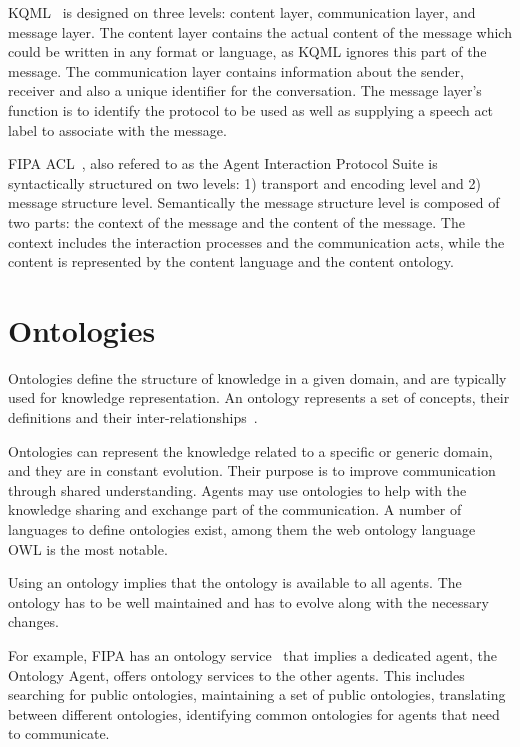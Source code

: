 \documentclass[a4paper,12pt,oneside,fleqn]{book} %
\begin{document}
KQML~\cite{DBLP:conf/cikm/FininFMM94} is designed on three levels: content
layer, communication layer, and message layer. The content layer contains
the actual content of the message which could be written in any format or
language, as KQML ignores this part of the message. The communication layer
contains information about the sender, receiver and also a unique
identifier for the conversation. The message layer's function is to
identify the protocol to be used as well as supplying a speech act label to
associate with the message.

FIPA ACL~\cite{DBLP:journals/taas/Poslad07}, also refered to as the Agent
Interaction Protocol Suite is syntactically structured on two levels: 1)
transport and encoding level and 2) message structure level. Semantically
the message structure level is composed of two parts: the context of the
message and the content of the message. The context includes the
interaction processes and the communication acts, while the content is
represented by the content language and the content ontology.

\section{Ontologies} %

Ontologies define the structure of knowledge in a given domain, and are
typically used for knowledge representation. An ontology represents a set
of concepts, their definitions and their inter-relationships~\cite{DBLP:journals/ker/UscholdG96}. 

Ontologies can represent the knowledge related to a specific or generic
domain, and they are in constant evolution. Their purpose is to improve
communication through shared understanding. Agents may use ontologies to
help with the knowledge sharing and exchange part of the communication. A
number of languages to define ontologies exist, among them the web ontology
language OWL is the most notable.

Using an ontology implies that the ontology is available to all agents. The
ontology has to be well maintained and has to evolve along with the
necessary changes.


For example, FIPA has an ontology service~\cite{web:fipaOntol} that implies
a dedicated agent, the Ontology Agent, offers ontology services to the
other agents.  This includes searching for public ontologies, maintaining a
set of public ontologies, translating between different ontologies,
identifying common ontologies for agents that need to communicate.
\end{document}
